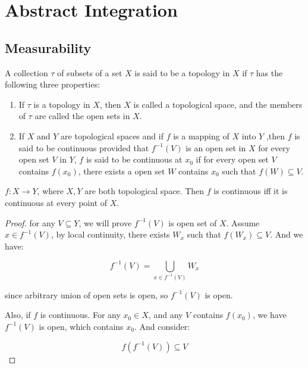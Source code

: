 \section{Abstract Integration}

\subsection{Measurability}

\begin{definition}
    A collection $\tau$ of subsets of a set $X$ is said to be a topology in $X$ if $\tau$ has the following three properties:

    \begin{enumerate}
        \item If $\tau$ is a topology in $X$, then $X$ is called a topological space, and the members of $\tau$ are called the open sets in $X$.
        \item If $X$ and $Y$ are topological spaces and if $f$ is a mapping of $X$ into $Y$ ,then $f$ is said to be continuous provided that $f ^ { - 1 } ( V )$ is an open set in $X$ for every open set $V$ in $Y$, $f$ is said to be 
        continuous at $x_0$ if for every open set $V$ contains $f(x_0)$, there exists a open set $W$ contains $x_0$  such that $f(W) \subseteq V$.
    \end{enumerate}

   

\end{definition}

\begin{thm}
    $f: X \to Y$, where $X,Y$ are both topological space. Then $f$ is continuous iff it is continuous at every point of $X$.
\end{thm}

\begin{proof}
    for any $V \subseteq Y$, we will prove $f^{-1}(V)$ is open set of $X$. Assume $x \in f^{-1}(V)$, by local continuity, there exists $W_x$
    such that $f(W_x) \subseteq V$. And we have:
    
    \[
        f^{-1}(V) = \bigcup_{x \in f^{-1}(V)}W_x
    \]

    since arbitrary union of open sets is open, so $f^{-1}(V)$ is open.

    Also, if $f$ is continuous. For any $x_0 \in X$, and any $V$ contains $f(x_0)$, we have $f^{-1}(V)$ is open, which 
    contains $x_0$. And consider:

    \[
        f(f^{-1}(V)) \subseteq V
    \]
\end{proof}

